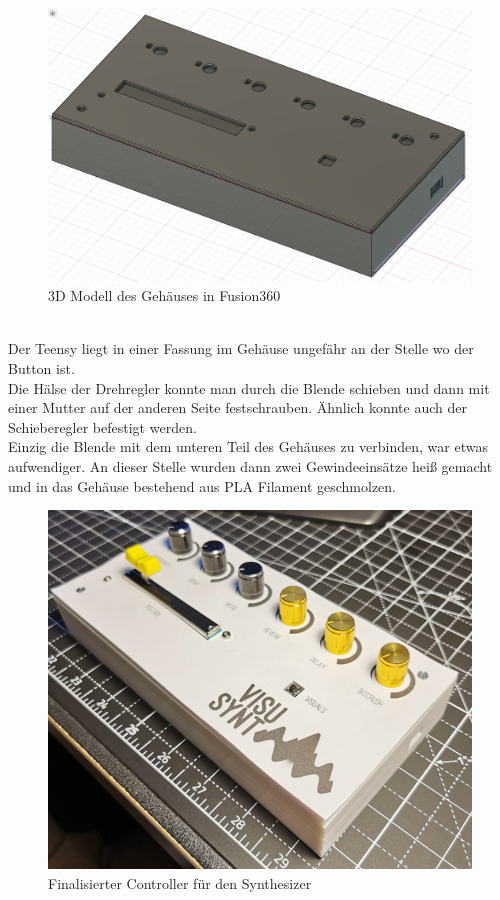 \documentclass[12pt]{scrartcl}%
\theoremstyle{nonumberplain}
\begin{document}
\begin{figure}[h]
\centering
  \includegraphics[scale=0.3]{hw_2}
  \caption{3D Modell des Gehäuses in Fusion360}
\end{figure}\\
Der Teensy liegt in einer Fassung im Gehäuse ungefähr an der Stelle wo der Button ist.\\
Die Hälse der Drehregler konnte man durch die Blende schieben und dann mit einer Mutter auf der anderen Seite festschrauben. Ähnlich konnte auch der Schieberegler befestigt werden.\\
Einzig die Blende mit dem unteren Teil des Gehäuses zu verbinden, war etwas aufwendiger. An dieser Stelle wurden dann zwei Gewindeeinsätze heiß gemacht und in das Gehäuse bestehend aus PLA Filament geschmolzen.\\
\begin{figure}[h]
\centering
  \includegraphics[scale=0.5]{hw_3}
  \caption{Finalisierter Controller für den Synthesizer}
\end{figure}\\
\end{document}
